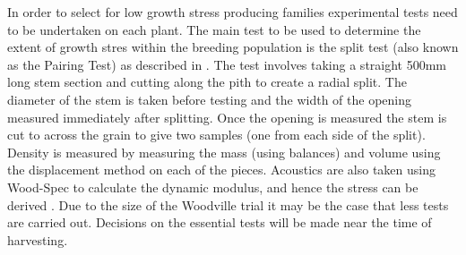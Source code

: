 In order to select for low growth stress producing families experimental tests
need to be undertaken on each plant. The main test to be used to determine the
extent of growth stres within the breeding population is the split test (also
known as the Pairing Test) as described in \cite{Chauhan_2010}. The test involves
taking a straight 500mm long stem section and cutting along the pith to create
a radial split. The diameter of the stem is taken before testing and the width
of the opening measured immediately after splitting. Once the opening is
measured the stem is cut to across the grain to give two samples (one from each
side of the split). Density is measured by measuring the mass (using balances)
and volume using the displacement method on each of the pieces. Acoustics are
also taken using Wood-Spec to calculate the dynamic modulus, and hence the
stress can be derived \cite{Chauhan_2010}. Due to the size of the Woodville trial it
may be the case that less tests are carried out. Decisions on the essential
tests will be made near the time of harvesting. 